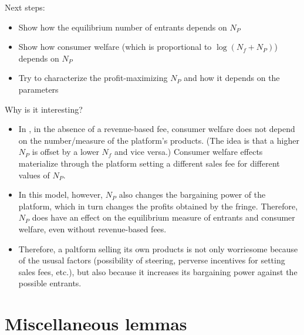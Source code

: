 \documentclass[a4paper]{article}
\begin{document}
Next steps:
\begin{itemize}
    \item Show how the equilibrium number of entrants depends on $N_P$
    \item Show how consumer welfare (which is proportional to $\log(N_f + N_P)$) depends on $N_P$
    \item Try to characterize the profit-maximizing $N_P$ and how it depends on the parameters
\end{itemize}

Why is it interesting?
\begin{itemize}
    \item In \textcite{anderson2021hybrid}, in the absence of a revenue-based fee, consumer welfare does not depend on the number/measure of the platform's products. (The idea is that a higher $N_P$ is offset by a lower $N_f$ and vice versa.) Consumer welfare effects materialize through the platform setting a different sales fee for different values of $N_P$.
    \item In this model, however, $N_P$ also changes the bargaining power of the platform, which in turn changes the profits obtained by the fringe. Therefore, $N_P$ does have an effect on the equilibrium measure of entrants and consumer welfare, even without revenue-based fees.
    \item Therefore, a paltform selling its own products is not only worriesome because of the ususal factors (possibility of steering, perverse incentives for setting sales fees, etc.), but also because it increases its bargaining power against the possible entrants.
\end{itemize}

\appendix

\printbibliography

\section{Miscellaneous lemmas}
\end{document}
